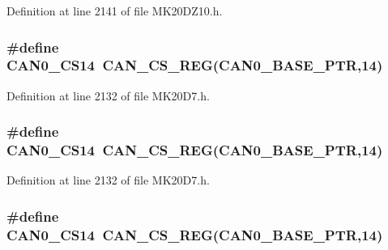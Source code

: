 Definition at line 2141 of file M\+K20\+D\+Z10.\+h.

\subsubsection[{\texorpdfstring{C\+A\+N0\+\_\+\+C\+S14}{CAN0_CS14}}]{\setlength{\rightskip}{0pt plus 5cm}\#define C\+A\+N0\+\_\+\+C\+S14~{\bf C\+A\+N\+\_\+\+C\+S\+\_\+\+R\+EG}({\bf C\+A\+N0\+\_\+\+B\+A\+S\+E\+\_\+\+P\+TR},14)}\hypertarget{group___c_a_n___register___accessor___macros_ga74a892dc153152ee16175503189147e2}{}\label{group___c_a_n___register___accessor___macros_ga74a892dc153152ee16175503189147e2}


Definition at line 2132 of file M\+K20\+D7.\+h.

\subsubsection[{\texorpdfstring{C\+A\+N0\+\_\+\+C\+S14}{CAN0_CS14}}]{\setlength{\rightskip}{0pt plus 5cm}\#define C\+A\+N0\+\_\+\+C\+S14~{\bf C\+A\+N\+\_\+\+C\+S\+\_\+\+R\+EG}({\bf C\+A\+N0\+\_\+\+B\+A\+S\+E\+\_\+\+P\+TR},14)}\hypertarget{group___c_a_n___register___accessor___macros_ga74a892dc153152ee16175503189147e2}{}\label{group___c_a_n___register___accessor___macros_ga74a892dc153152ee16175503189147e2}


Definition at line 2132 of file M\+K20\+D7.\+h.

\subsubsection[{\texorpdfstring{C\+A\+N0\+\_\+\+C\+S14}{CAN0_CS14}}]{\setlength{\rightskip}{0pt plus 5cm}\#define C\+A\+N0\+\_\+\+C\+S14~{\bf C\+A\+N\+\_\+\+C\+S\+\_\+\+R\+EG}({\bf C\+A\+N0\+\_\+\+B\+A\+S\+E\+\_\+\+P\+TR},14)}\hypertarget{group___c_a_n___register___accessor___macros_ga74a892dc153152ee16175503189147e2}{}\label{group___c_a_n___register___accessor___macros_ga74a892dc153152ee16175503189147e2}


